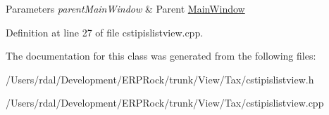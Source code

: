 \begin{DoxyParams}{\-Parameters}
{\em parent\-Main\-Window} & \-Parent \hyperlink{class_main_window}{\-Main\-Window} \\
\hline
\end{DoxyParams}


\-Definition at line 27 of file cstipislistview.\-cpp.



\-The documentation for this class was generated from the following files\-:\begin{DoxyCompactItemize}
\item 
/\-Users/rdal/\-Development/\-E\-R\-P\-Rock/trunk/\-View/\-Tax/cstipislistview.\-h\item 
/\-Users/rdal/\-Development/\-E\-R\-P\-Rock/trunk/\-View/\-Tax/cstipislistview.\-cpp\end{DoxyCompactItemize}
